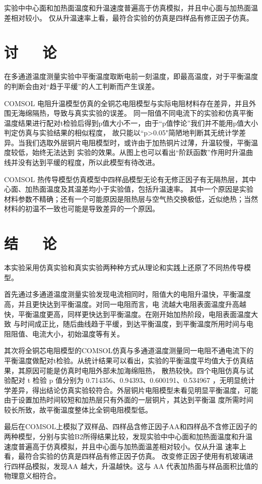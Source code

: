 \documentclass[10pt,a4paper,twoside,UTF8]{ctexart}
\begin{document}
实验中中心面和加热面温度和升温速度普遍高于仿真模拟，并且中心面与加热面温差相对较小。
仅从升温速率上看，最符合实验的仿真是四样品有修正因子仿真。

\section{讨~~~论}
在多通道温度测量实验中平衡温度取断电前一刻温度，即最高温度，对于平衡温度的判断会由对“趋于平缓”的人工判断而产生误差。

COMSOL 电阻升温模型仿真的全铜芯电阻模型与实际电阻材料存在差异，并且外围无海绵隔热，导致与真实实验的误差。
同一阻值不同电流下的实验和仿真平衡温度结果进行配对t检验后得到p值大小不一，由于“p值悖论”我们并不能用p值大小判定仿真与实验结果的相似程度，
故只能以“p>0.05"简陋地判断其无统计学差异。当我们选取外层铜片电阻模型时，或许由于加热铜片过薄，升温较慢，平衡温度较低，始终无法达到
实验的效果。从图上也可以看出“阶跃函数”作用时升温曲线并没有达到平缓的程度，所以此模型有待改进。

COMSOL 热传导模型仿真模型中四样品模型无论有无修正因子有无隔热层，其中心面、加热面温度及其温差均小于实验值，包括升温速率。
其中一个原因是实验材料参数不精确；还有一个可能原因是阻热层与空气热交换极低，近似绝热；当然材料的初温不一致也可能是导致差异的一个原因。

\section{结~~~论}
本实验采用仿真实验和真实实验两种种方式从理论和实践上还原了不同热传导模型。

首先通过多通道温度测量实验发现电流相同时，阻值大的电阻升温快，平衡温度高，并且更快达到平衡温度。对同一电阻而言，电
流越大电阻表面温度升高越快，平衡温度更高，同样更快达到平衡温度。在刚开始加热阶段，电阻表面温度大致
与时间成正比，随后曲线趋于平缓，到达平衡温度，到平衡温度所用时间与电阻阻值、电流大小，初始温度等有关。
  
其次将全铜芯电阻模型的COMSOL仿真与多通道温度测量同一电阻不通电流下的平衡温度做配对t检验。从统计结果可以看出，实验的平衡温度平均值大于仿真结果，其原因可能是仿真时电阻外部未加海绵阻热，
散热较快。四个电阻仿真与试验配对 t 检验 p 值分别为 0.714356、0.94393、0.600191、0.534967 ，无明显统计
学差异，得出结论仿真实验较符合。外层铜片电阻模型未看见明显平衡温度，可能由于设置加热时间较短和加热层只有外面的一层铜片，其达到平衡温
度所需时间较长所致，故平衡温度整体比全铜电阻模型低。

最后在COMSOL上模拟了双样品、四样品含修正因子AA和四样品不含修正因子的两种模型，分别与实验B2所得结果比较，发现实验中中心面和加热面温度和升温速度普遍高于仿真模拟，并且中心面与加热面温差相对较小。仅从升温
速率上看，最符合实验的仿真是四样品有修正因子仿真。
改变修正因子使用有机玻璃进行四样品模拟，发现AA 越大，升温越快。这与 AA 代表加热面与样品面积比值的物理意义相符合。
\end{document}
